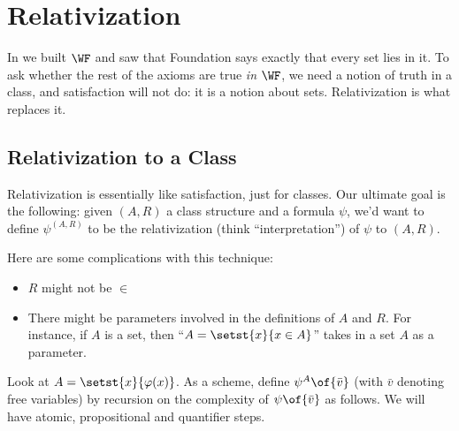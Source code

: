 \section{Relativization}

In  we built $\WF$ and saw that Foundation says exactly that every set lies in it. To ask whether the rest of the axioms are true \textit{in} $\WF$, we need a notion of truth in a class, and satisfaction will not do: it is a notion about sets. Relativization is what replaces it.

\subsection{Relativization to a Class}

Relativization is essentially like satisfaction, just for classes. Our ultimate goal is the following: given $(A, R)$ a class structure and a formula $\psi$, we'd want to define $\psi^{(A, R)}$ to be the relativization (think ``interpretation'') of $\psi$ to $(A, R)$.

Here are some complications with this technique:
\begin{itemize}
    \item $R$ might not be $\in$
    \item There might be parameters involved in the definitions of $A$ and $R$. For instance, if $A$ is a set, then ``$A = \setst{x}{x \in A}$'' takes in a set $A$ as a parameter.
\end{itemize}

Look at $A = \setst{x}{\varphi(x)}$. As a scheme, define $\psi^A\of{\bar{v}}$ (with $\bar{v}$ denoting free variables) by recursion on the complexity of $\psi\of{\bar{v}}$ as follows. We will have atomic, propositional and quantifier steps.


